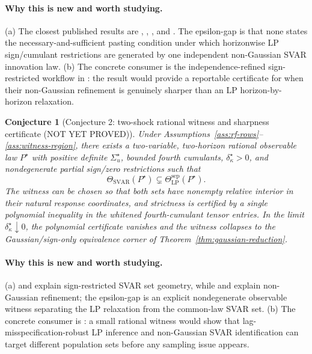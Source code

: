\documentclass[11pt]{article}
\theoremstyle{definition}
\theoremstyle{plain}
\newtheorem{conjecture}{Conjecture}
\theoremstyle{remark}
\begin{document}
\paragraph{Why this is new and worth studying.}
(a) The closest published results are \citet{PlagborgMollerWolf2021}, \citet{GourierouxMonfortRenne2017}, \citet{LanneMeitzSaikkonen2017}, and \citet{DrautzburgWright2023}.  The epsilon-gap is that none states the necessary-and-sufficient pasting condition under which horizonwise LP sign/cumulant restrictions are generated by one independent non-Gaussian SVAR innovation law.  (b) The concrete consumer is the independence-refined sign-restricted workflow in \citet{DrautzburgWright2023}: the result would provide a reportable certificate for when their non-Gaussian refinement is genuinely sharper than an LP horizon-by-horizon relaxation.

\begin{conjecture}[Conjecture 2: two-shock rational witness and sharpness certificate (NOT YET PROVED)]\label{conj:two-shock-witness}
Under Assumptions~\ref{ass:rf-rows}--\ref{ass:witness-region}, there exists a two-variable, two-horizon rational observable law \(P^\star\) with positive definite \(\Sigma_u^\star\), bounded fourth cumulants, \(\delta_\kappa^\star>0\), and nondegenerate partial sign/zero restrictions such that
\[
\Theta_{\mathrm{SVAR}}(P^\star)\subsetneq\Theta_{\mathrm{LP}}^{\mathrm{sep}}(P^\star).
\]
The witness can be chosen so that both sets have nonempty relative interior in their natural response coordinates, and strictness is certified by a single polynomial inequality in the whitened fourth-cumulant tensor entries.  In the limit \(\delta_\kappa^\star\downarrow0\), the polynomial certificate vanishes and the witness collapses to the Gaussian/sign-only equivalence corner of Theorem~\ref{thm:gaussian-reduction}.
\end{conjecture}
\paragraph{Why this is new and worth studying.}
(a) \citet{BaumeisterHamilton2015} and \citet{AriasRubioRamirezWaggoner2018} explain sign-restricted SVAR set geometry, while \citet{LanneMeitzSaikkonen2017} and \citet{DrautzburgWright2023} explain non-Gaussian refinement; the epsilon-gap is an explicit nondegenerate observable witness separating the LP relaxation from the common-law SVAR set.  (b) The concrete consumer is \citet{MontielOleaPlagborgMollerQianWolf2024}: a small rational witness would show that lag-misspecification-robust LP inference and non-Gaussian SVAR identification can target different population sets before any sampling issue appears.
\end{document}
